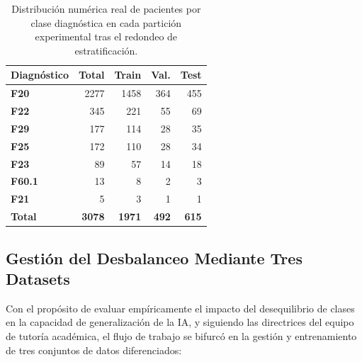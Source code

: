 \documentclass[12pt,a4paper,onecolumn,oneside]{report}
\begin{document}
\begin{table}[htbp]
\centering
\small
\begin{tabular}{lrrrr}
\hline
\textbf{Diagnóstico} & \textbf{Total} & \textbf{Train} & \textbf{Val.} & \textbf{Test} \\ \hline
\textbf{F20} & 2277 & 1458 & 364 & 455 \\ 
\textbf{F22} & 345 & 221 & 55 & 69 \\ 
\textbf{F29} & 177 & 114 & 28 & 35 \\ 
\textbf{F25} & 172 & 110 & 28 & 34 \\ 
\textbf{F23} & 89 & 57 & 14 & 18 \\ 
\textbf{F60.1} & 13 & 8 & 2 & 3 \\ 
\textbf{F21} & 5 & 3 & 1 & 1 \\ 
\textbf{Total} & \textbf{3078} & \textbf{1971} & \textbf{492} & \textbf{615} \\ \hline
\end{tabular}
\caption{Distribución numérica real de pacientes por clase diagnóstica en cada partición experimental tras el redondeo de estratificación.}
\label{tab:distribucion_particiones}
\end{table}

\subsection{Gestión del Desbalanceo Mediante Tres Datasets}
Con el propósito de evaluar empíricamente el impacto del desequilibrio de clases en la capacidad de generalización de la IA, y siguiendo las directrices del equipo de tutoría académica, el flujo de trabajo se bifurcó en la gestión y entrenamiento de tres conjuntos de datos diferenciados:
\end{document}
